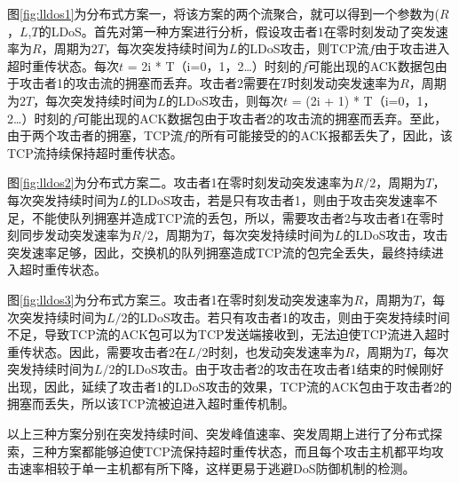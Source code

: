 图\ref{fig:lldos1}为分布式方案一，将该方案的两个流聚合，就可以得到一个参数为($R$，$L$,$T$的LDoS。首先对第一种方案进行分析，假设攻击者1在零时刻发动了突发速率为$R$，周期为$2T$，每次突发持续时间为$L$的LDoS攻击，则TCP流$f$由于攻击进入超时重传状态。每次$t$ = 2i * T（i=0，1，2…）时刻的$f$可能出现的ACK数据包由于攻击者1的攻击流的拥塞而丢弃。攻击者2需要在$T$时刻发动突发速率为$R$，周期为$2T$，每次突发持续时间为$L$的LDoS攻击，则每次$t$ = (2i + 1) * T（i=0，1，2…）时刻的$f$可能出现的ACK数据包由于攻击者2的攻击流的拥塞而丢弃。至此，由于两个攻击者的拥塞，TCP流$f$的所有可能接受的的ACK报都丢失了，因此，该TCP流持续保持超时重传状态。


图\ref{fig:lldos2}为分布式方案二。攻击者1在零时刻发动突发速率为$R/2$，周期为$T$，每次突发持续时间为$L$的LDoS攻击，若是只有攻击者1，则由于攻击突发速率不足，不能使队列拥塞并造成TCP流的丢包，所以，需要攻击者2与攻击者1在零时刻同步发动突发速率为$R/2$，周期为$T$，每次突发持续时间为$L$的LDoS攻击，攻击突发速率足够，因此，交换机的队列拥塞造成TCP流的包完全丢失，最终持续进入超时重传状态。


图\ref{fig:lldos3}为分布式方案三。攻击者1在零时刻发动突发速率为$R$，周期为$T$，每次突发持续时间为$L/2$的LDoS攻击。若只有攻击者1的攻击，则由于突发持续时间不足，导致TCP流的ACK包可以为TCP发送端接收到，无法迫使TCP流进入超时重传状态。因此，需要攻击者2在$L/2$时刻，也发动突发速率为$R$，周期为$T$，每次突发持续时间为$L/2$的LDoS攻击。由于攻击者2的攻击在攻击者1结束的时候刚好出现，因此，延续了攻击者1的LDoS攻击的效果，TCP流的ACK包由于攻击者2的拥塞而丢失，所以该TCP流被迫进入超时重传机制。

以上三种方案分别在突发持续时间、突发峰值速率、突发周期上进行了分布式探索，三种方案都能够迫使TCP流保持超时重传状态，而且每个攻击主机都平均攻击速率相较于单一主机都有所下降，这样更易于逃避DoS防御机制的检测。


